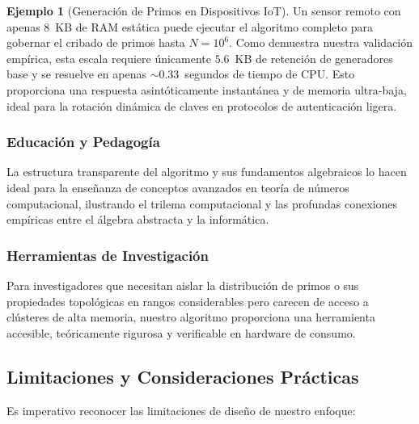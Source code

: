 \documentclass{article}
\numberwithin{equation}{section}
\theoremstyle{plain}
\theoremstyle{definition}
\newtheorem{example}[theorem]{Ejemplo}
\begin{document}
\begin{example}[Generación de Primos en Dispositivos IoT]
Un sensor remoto con apenas $8$~KB de RAM estática puede ejecutar el algoritmo completo para gobernar el cribado de primos hasta $N = 10^6$. Como demuestra nuestra validación empírica, esta escala requiere únicamente $5.6$~KB de retención de generadores base y se resuelve en apenas $\sim 0.33$~segundos de tiempo de CPU. Esto proporciona una respuesta asintóticamente instantánea y de memoria ultra-baja, ideal para la rotación dinámica de claves en protocolos de autenticación ligera.
\end{example}

\subsubsection{Educación y Pedagogía}

La estructura transparente del algoritmo y sus fundamentos algebraicos lo hacen ideal para la enseñanza de conceptos avanzados en teoría de números computacional, ilustrando el trilema computacional y las profundas conexiones empíricas entre el álgebra abstracta y la informática.

\subsubsection{Herramientas de Investigación}

Para investigadores que necesitan aislar la distribución de primos o sus propiedades topológicas en rangos considerables pero carecen de acceso a clústeres de alta memoria, nuestro algoritmo proporciona una herramienta accesible, teóricamente rigurosa y verificable en hardware de consumo.

\subsection{Limitaciones y Consideraciones Prácticas}

Es imperativo reconocer las limitaciones de diseño de nuestro enfoque:
\end{document}
